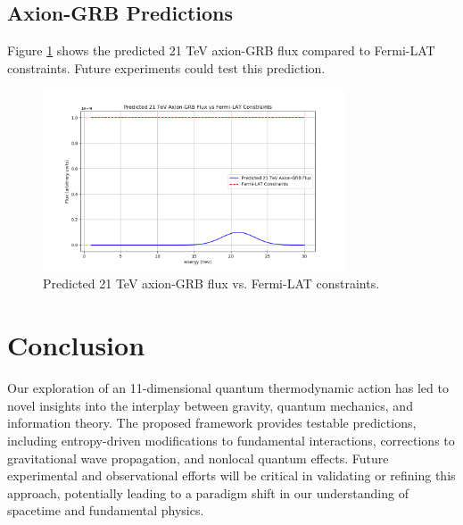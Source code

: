 \documentclass[12pt]{article}
\begin{document}
\subsection{Axion-GRB Predictions}
Figure \ref{fig:axion_grb} shows the predicted 21 TeV axion-GRB flux compared to Fermi-LAT constraints. Future experiments could test this prediction.

\begin{figure}[h!]
    \centering
    \includegraphics[width=0.8\textwidth]{axion_grb_flux.png} %
    \caption{Predicted 21 TeV axion-GRB flux vs. Fermi-LAT constraints.}
    \label{fig:axion_grb}
\end{figure}

\section{Conclusion}
Our exploration of an 11-dimensional quantum thermodynamic action has led to novel insights into the interplay between gravity, quantum mechanics, and information theory. The proposed framework provides testable predictions, including entropy-driven modifications to fundamental interactions, corrections to gravitational wave propagation, and nonlocal quantum effects. Future experimental and observational efforts will be critical in validating or refining this approach, potentially leading to a paradigm shift in our understanding of spacetime and fundamental physics.



\end{document}
